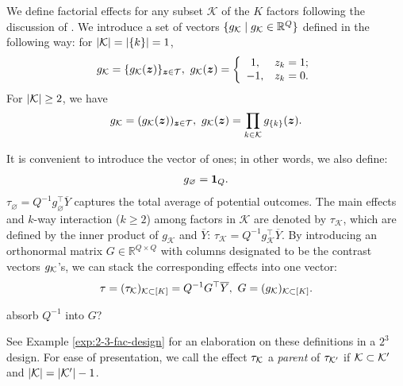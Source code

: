 \documentclass[12pt]{article}
\newtheorem{remark}{Remark}
\begin{document}
We define factorial effects for any subset $\mathcal{K}$ of the $K$ factors following the discussion of \cite{dasgupta2015causal,zhao2021regression, wu2011experiments}.   We introduce a set of vectors $\{g_{\mathcal{K}}\mid g_{\mathcal{K}}\in{\mathbb{R}}^Q\}$ defined in the following way: for $|{\mathcal{K}}| = |\{k\}| = 1$,
\begin{align*}
    g_{\mathcal{K}} = \{g_{\mathcal{K}}({\boldsymbol{z}})\}_{{\boldsymbol{z}}\in{\mathcal{T}}}, ~ g_{\mathcal{K}}({\boldsymbol{z}}) = \left\{
    \begin{array}{cc}
        1, & z_k = 1;  \\
        -1, & z_k = 0.
    \end{array}
    \right.
\end{align*}
For $|{\mathcal{K}}|\ge 2$, we have
\begin{align*}
    g_{\mathcal{K}} = (g_{\mathcal{K}}({\boldsymbol{z}}))_{{\boldsymbol{z}}\in{\mathcal{T}}}, ~g_{{\mathcal{K}}}({\boldsymbol{z}}) = \prod_{k\in{\mathcal{K}}} g_{\{k\}}({\boldsymbol{z}}).
\end{align*}


It is convenient to introduce the vector of ones; in other words, we also define:
\begin{align*}
   g_\varnothing = {\boldsymbol{1}}_{Q}.
\end{align*}
$\tau_\varnothing = Q^{-1}g_\varnothing^\top \overline{Y}$ captures the total average of potential outcomes. The main effects and $k$-way interaction ($k \ge 2$) among factors in $\mathcal{K}$ are denoted by $\tau_{\mathcal{K}}$, which are defined by the inner product of $g_{\mathcal{K}}$ and $\overline{Y}$: $\tau_{\mathcal{K}} = Q^{-1} g_{\mathcal{K}}^\top \overline{Y}$. By introducing an orthonormal matrix ${G}\in\mathbb{R}^{Q\times Q}$ with columns designated to be the contrast vectors $g_{\mathcal{K}}$'s, we can stack the corresponding effects into one vector:
 \begin{align}\label{eqn:def-factorial-effects}
     \tau = (\tau_{\mathcal{K}})_{\mathcal{K}\subset [K]} = Q^{-1}{G}^\top \overline{Y}, ~ G = (g_{\mathcal{K}})_{{\mathcal{K}}\subset [K]}.
 \end{align}
 

{\color{red} absorb $Q^{-1}$ into $G$?} 
 
See Example \ref{exp:2-3-fac-design} for an elaboration on these definitions in a $2^3$ design. For ease of presentation, we call the effect $\tau_{\mathcal{K}}$ a \textit{parent} of $\tau_{{\mathcal{K}}'}$ if ${\mathcal{K}}\subset{\mathcal{K}}'$ and $|{\mathcal{K}}| = |{\mathcal{K}}'| - 1$.
\end{document}
